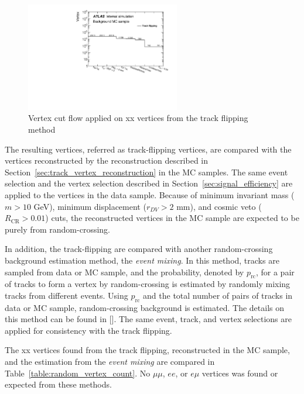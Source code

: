 \begin{figure}[tb]
	\includegraphics[width=0.60\textwidth]{figures/m_FBE_cutflow_MC.pdf}
	\centering
	\caption{Vertex cut flow applied on xx vertices from the track flipping method}
	\label{fig:m_FBE_cutflow_MC}
\end{figure}

The resulting vertices, referred as track-flipping vertices, are compared with the vertices reconstructed by the reconstruction described in Section~\ref{sec:track_vertex_reconstruction} in the MC samples. The same event selection and the vertex selection described in Section~\ref{sec:signal_efficiency} are applied to the vertices in the data sample. Because of minimum invariant mass ($m > 10$ GeV), minimum displacement ($r_{DV} > 2$ mm), and cosmic veto ($R_{\mathrm{CR}} > 0.01$) cuts, the reconstructed vertices in the MC sample are expected to be purely from random-crossing.

In addition, the track-flipping are compared with another random-crossing background estimation method, the \textit{event mixing}. In this method, tracks are sampled from data or MC sample, and the probability, denoted by $p_{\mathrm{rc}}$, for a pair of tracks to form a vertex by random-crossing is estimated by randomly mixing tracks from different events. Using $p_{\mathrm{rc}}$ and the total number of pairs of tracks in data or MC sample, random-crossing background is estimated. The details on this method can be found in []. The same event, track, and vertex selections are applied for consistency with the track flipping.

The xx vertices found from the track flipping, reconstructed in the MC sample, and the estimation from the \textit{event mixing} are compared in Table~\ref{table:random_vertex_count}. No $\mu\mu$, $ee$, or $e\mu$ vertices was found or expected from these methods.
 
